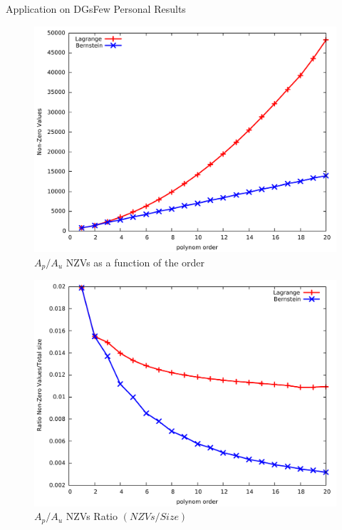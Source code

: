 \documentclass[10pt]{beamer}
\begin{document}
\begin{frame}{Application on DGs}{Few Personal Results}    
    \begin{figure}[H]
      \begin{minipage}[top]{0.50\linewidth}
        \centering
        \includegraphics[scale=0.24]{bernstein1.pdf}
        \footnotesize
        $A_p/A_u$ NZVs as a function of the order
        \normalsize
      \end{minipage}
      \hspace{-0.3cm}
      \begin{minipage}[top]{0.50\linewidth}
        \centering
        \includegraphics[scale=0.24]{bernstein2.pdf}
        \footnotesize
        $A_p/A_u$ NZVs Ratio $(NZVs/Size)$
        \normalsize
      \end{minipage}\hfill
    \end{figure}
\end{frame}
\end{document}
